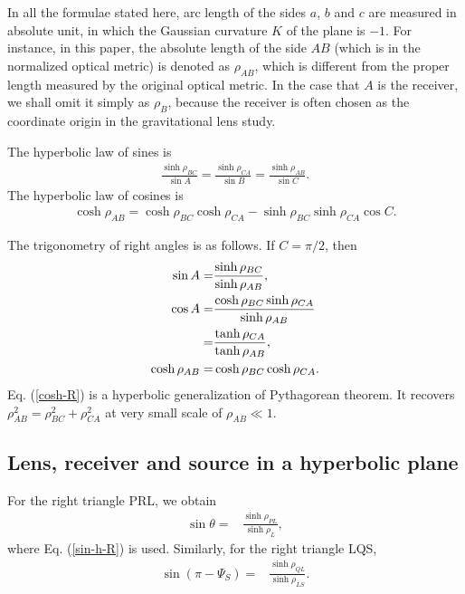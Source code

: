 \documentclass[twocolumn,showpacs,preprintnumbers,amsmath,amssymb]{revtex4-1}
\begin{document}
In all the formulae stated here,  
arc length of the sides $a$, $b$ and $c$ are measured in absolute unit, 
in which the Gaussian curvature $K$ of the plane is $-1$. 
For instance, in this paper, the absolute length of the side $AB$ 
(which is in the normalized optical metric) is 
denoted as $\rho_{AB}$, 
which is different from the proper length measured 
by the original optical metric. 
In the case that $A$ is the receiver, 
we shall omit it simply as 
$\rho_B$, 
because the receiver is often chosen as the coordinate origin 
in the gravitational lens study. 


The hyperbolic law of sines is 
\begin{align}
\frac{\sinh\rho_{BC}}{\sin A} 
= 
\frac{\sinh\rho_{CA}}{\sin B} 
=
\frac{\sinh\rho_{AB}}{\sin C} . 
\label{sine-h}
\end{align}
The hyperbolic law of cosines is 
\begin{align}
\cosh\rho_{AB} = \cosh\rho_{BC} \cosh\rho_{CA} - \sinh\rho_{BC} \sinh\rho_{CA} \cos C . 
\label{cos-h}
\end{align}

The trigonometry of right angles is as follows. 
If $C = \pi/2$, then 
\begin{align}
\sin A =& 
\frac{\sinh\rho_{BC}}{\sinh\rho_{AB}} , 
\label{sin-h-R}
\\
\cos A =&
\frac{\cosh\rho_{BC}\sinh\rho_{CA}}{\sinh \rho_{AB}}
\notag\\
=&
\frac{\tanh\rho_{CA}}{\tanh\rho_{AB}} , 
\label{cos-h-R}
\\
\cosh\rho_{AB} =&
 \cosh\rho_{BC} \cosh\rho_{CA} . 
 \label{cosh-R}
\end{align} 
Eq. (\ref{cosh-R}) is a hyperbolic generalization of Pythagorean theorem. 
It recovers $\rho_{AB}^2 = \rho_{BC}^2 + \rho_{CA}^2$ 
at very small scale of $\rho_{AB} \ll 1$. 



\subsection{Lens, receiver and source in a hyperbolic plane}
For the right triangle PRL, we obtain 
\begin{align}
\sin\theta 
=&
\frac{\sinh \rho_{PL}}{\sinh \rho_L} ,
\label{PRL-h}
\end{align}
where Eq. (\ref{sin-h-R}) is used. 
Similarly, for the right triangle LQS, 
\begin{align}
\sin(\pi - \Psi_S)  
=&
\frac{\sinh \rho_{QL}}{\sinh \rho_{LS}} .
\label{LQS-h}
\end{align}
\end{document}
